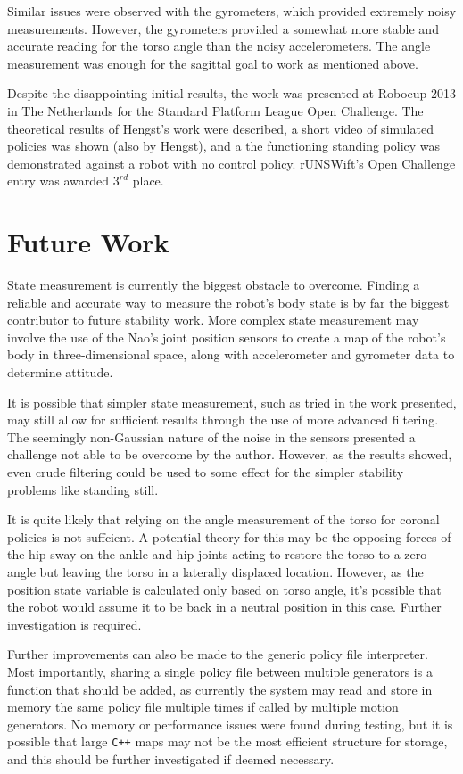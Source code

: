 Similar issues were observed with the gyrometers, which provided extremely noisy measurements. However, the gyrometers provided a somewhat more stable and accurate reading for the torso angle than the noisy accelerometers. The angle measurement was enough for the sagittal goal to work as mentioned above.

Despite the disappointing initial results, the work was presented at Robocup 2013 in The Netherlands for the Standard Platform League Open Challenge. The theoretical results of Hengst's work\cite{bernhard_rl} were described, a short video of simulated policies was shown (also by Hengst), and a the functioning standing policy was demonstrated against a robot with no control policy. rUNSWift's Open Challenge entry was awarded $3^{rd}$ place.

\newpage
\section{Future Work}

State measurement is currently the biggest obstacle to overcome. Finding a reliable and accurate way to measure the robot's body state is by far the biggest contributor to future stability work. More complex state measurement may involve the use of the Nao's joint position sensors to create a map of the robot's body in three-dimensional space, along with accelerometer and gyrometer data to determine attitude.

It is possible that simpler state measurement, such as tried in the work presented, may still allow for sufficient results through the use of more advanced filtering. The seemingly non-Gaussian nature of the noise in the sensors presented a challenge not able to be overcome by the author. However, as the results showed, even crude filtering could be used to some effect for the simpler stability problems like standing still.

It is quite likely that relying on the angle measurement of the torso for coronal policies is not suffcient. A potential theory for this may be the opposing forces of the hip sway on the ankle and hip joints acting to restore the torso to a zero angle but leaving the torso in a laterally displaced location. However, as the position state variable is calculated only based on torso angle, it's possible that the robot would assume it to be back in a neutral position in this case. Further investigation is required.

Further improvements can also be made to the generic policy file interpreter. Most importantly, sharing a single policy file between multiple generators is a function that should be added, as currently the system may read and store in memory the same policy file multiple times if called by multiple motion generators. No memory or performance issues were found during testing, but it is possible that large \verb!C++! maps may not be the most efficient structure for storage, and this should be further investigated if deemed necessary.

